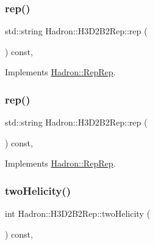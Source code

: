 \subsubsection{\texorpdfstring{rep()}{rep()}\hspace{0.1cm}{\footnotesize\ttfamily [2/3]}}
{\footnotesize\ttfamily std\+::string Hadron\+::\+H3\+D2\+B2\+Rep\+::rep (\begin{DoxyParamCaption}{ }\end{DoxyParamCaption}) const\hspace{0.3cm}{\ttfamily [inline]}, {\ttfamily [virtual]}}



Implements \mbox{\hyperlink{structHadron_1_1RepRep_ab3213025f6de249f7095892109575fde}{Hadron\+::\+Rep\+Rep}}.

\mbox{\label{structHadron_1_1H3D2B2Rep_af5ed865d7a3f08904144cb23f152ecb5}} 
\subsubsection{\texorpdfstring{rep()}{rep()}\hspace{0.1cm}{\footnotesize\ttfamily [3/3]}}
{\footnotesize\ttfamily std\+::string Hadron\+::\+H3\+D2\+B2\+Rep\+::rep (\begin{DoxyParamCaption}{ }\end{DoxyParamCaption}) const\hspace{0.3cm}{\ttfamily [inline]}, {\ttfamily [virtual]}}



Implements \mbox{\hyperlink{structHadron_1_1RepRep_ab3213025f6de249f7095892109575fde}{Hadron\+::\+Rep\+Rep}}.

\mbox{\label{structHadron_1_1H3D2B2Rep_ad64aabbb6d77c697acb2c327018ecfea}} 
\subsubsection{\texorpdfstring{twoHelicity()}{twoHelicity()}\hspace{0.1cm}{\footnotesize\ttfamily [1/2]}}
{\footnotesize\ttfamily int Hadron\+::\+H3\+D2\+B2\+Rep\+::two\+Helicity (\begin{DoxyParamCaption}{ }\end{DoxyParamCaption}) const\hspace{0.3cm}{\ttfamily [inline]}, {\ttfamily [virtual]}}


